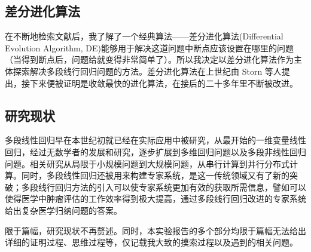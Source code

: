 \subsection{差分进化算法}

在不断地检索文献后，我了解了一个经典算法——差分进化算法\cite{ref1}(Differential Evolution Algorithm, DE)能够用于解决这道问题中断点应该设置在哪里的问题（当得到断点后，问题给就变得非常简单了）。所以我决定以差分进化算法作为主体探索解决多段线行回归问题的方法。差分进化算法在上世纪由 Storn 等人提出，接下来便被证明是收敛最快的进化算法，在接后的二十多年里不断被改进。


\subsection{研究现状}

多段线性回归早在本世纪初就已经在实际应用中被研究，从最开始的一维变量线性回归，经过无数学者的发展和研究，逐步扩展到多维回归问题以及多段非线性回归问题。相关研究从局限于小规模问题到大规模问题，从串行计算到并行分布式计算。同时，多段线性回归还被用来构建专家系统\cite{ref2}，是这一传统领域又有了新的突破；多段线行回归方法的引入可以使专家系统更加有效的获取所需信息，譬如可以使得医学中肿瘤评估的工作效率得到极大提高\cite{ref3}，通过多段线行回归改进的专家系统给出复杂医学归纳问题的答案。

限于篇幅，研究现状不再赘述。同时，本实验报告的多个部分均限于篇幅无法给出详细的证明过程、思维过程等，仅记载我大致的摸索过程以及遇到的相关问题。




